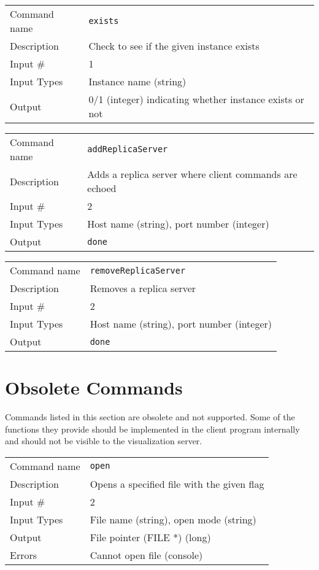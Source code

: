 \bigskip

\noindent
\begin{tabular}{l|p{5in}}
\hline
Command name & {\tt exists} \\
Description  & Check to see if the given instance exists \\
Input \#     & 1 \\
Input Types  & Instance name (string) \\
Output       & 0/1 (integer) indicating whether instance exists or not \\
\hline
\end{tabular}

\bigskip

\noindent
\begin{tabular}{l|p{5in}}
\hline
Command name & {\tt addReplicaServer} \\
Description  & Adds a replica server where client commands are echoed \\
Input \#     & 2 \\
Input Types  & Host name (string), port number (integer) \\
Output       & {\tt done} \\
\hline
\end{tabular}

\bigskip

\noindent
\begin{tabular}{l|p{5in}}
\hline
Command name & {\tt removeReplicaServer} \\
Description  & Removes a replica server \\
Input \#     & 2 \\
Input Types  & Host name (string), port number (integer) \\
Output       & {\tt done} \\
\hline
\end{tabular}

\section{Obsolete Commands}

Commands listed in this section are obsolete and not supported. Some
of the functions they provide should be implemented in the client
program internally and should not be visible to the visualization
server.

\bigskip

\noindent
\begin{tabular}{l|p{5in}}
\hline
Command name & {\tt open} \\
Description  & Opens a specified file with the given flag \\
Input \#     & 2 \\
Input Types  & File name (string), open mode (string) \\
Output       & File pointer (FILE *) (long) \\
Errors       & Cannot open file (console) \\
\hline
\end{tabular}

